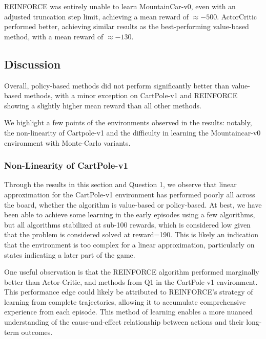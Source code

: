 \documentclass{article}
\begin{document}
REINFORCE was entirely unable to learn MountainCar-v0, even with an adjusted truncation step limit,
achieving a mean reward of $\approx -500$. ActorCritic performed better, achieving similar
results as the best-performing value-based method, with a mean reward of $\approx -130$.




\subsection{Discussion}
Overall, policy-based methods did not perform significantly better than value-based methods,
with a minor exception on CartPole-v1 and REINFORCE showing a slightly higher mean reward than
all other methods.




We highlight a few points of the environments observed in the results: notably, the non-linearity of
Cartpole-v1 and the difficulty in learning the Mountaincar-v0 environment with Monte-Carlo variants.




\subsubsection{Non-Linearity of CartPole-v1}




Through the results in this section and Question 1, we observe that linear approximation
for the CartPole-v1 environment has performed poorly all across the board, whether the algorithm
is value-based or policy-based. At best, we have been
able to achieve some learning in the early episodes using a few algorithms, but all algorithms
stabilized at sub-100 rewards, which is considered low given that the problem is considered solved at reward=190\cite{gym}.
This is likely an indication that the environment is too complex for a linear
approximation, particularly on states indicating a later part of the game.




One useful observation is that the REINFORCE algorithm performed marginally better
than Actor-Critic, and methods from Q1 in the CartPole-v1 environment.
This performance edge could likely be attributed to REINFORCE's strategy of learning from complete trajectories,
allowing it to accumulate comprehensive experience from each episode.
This method of learning enables a more nuanced understanding of the cause-and-effect
relationship between actions and their long-term outcomes.
\end{document}
